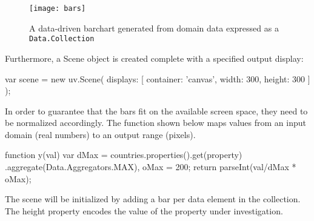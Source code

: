 \begin{english}
\begin{figure}
\centering
\texttt{[image: bars]}
\caption{A data-driven barchart generated from domain data expressed as a \texttt{Data.Collection}}
\label{fig:bars}
\end{figure}

\SuperPar Furthermore, a Scene object is created complete with a specified output display:

\begin{program}
\begin{CppSourceCode}
var scene = new uv.Scene({
  displays: [{
    container: 'canvas',
    width: 300,
    height: 300
  }]
});
\end{CppSourceCode}
\end{program}


\SuperPar In order to guarantee that the bars fit on the available screen space, they need to be normalized accordingly. The function shown below maps values from an input domain (real numbers) to an output range (pixels).


\begin{program}
\begin{CppSourceCode}
function y(val) {
  var dMax = countries.properties().get(property)
              .aggregate(Data.Aggregators.MAX),
      oMax = 200;
  return parseInt(val/dMax * oMax);
}
\end{CppSourceCode}
\end{program}

\SuperPar The scene will be initialized by adding a bar per data element in the collection. The height property encodes the value of the property under investigation.




\end{english}
